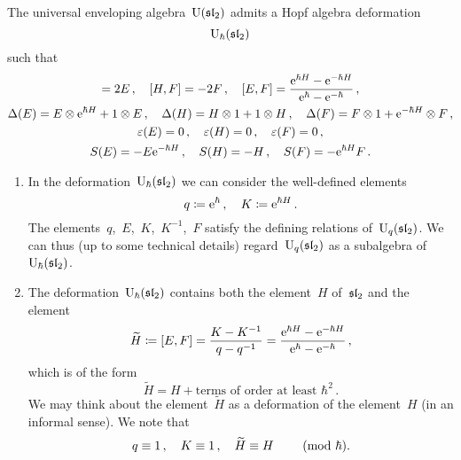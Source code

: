 \documentclass[a4paper, 11pt, oneside]{scrartcl}
\begin{document}
\begin{theorem}
  The universal enveloping algebra~$\operatorname{U}(\mathfrak{sl}_2)$ admits a Hopf algebra deformation
  \[
    \operatorname{U}_{\hbar}(\mathfrak{sl}_2)
  \]
  such that
  \begin{gather*}
    [H, E] = 2E \,,
    \quad
    [H, F] = -2F \,,
    \quad
    [E, F]
    =
    \frac{ \e^{\hbar H} - \e^{-\hbar H} }{ \e^{\hbar} - \e^{-\hbar} } \,,
    \\
    \Delta(E) = E \tensor \e^{\hbar H} + 1 \tensor E \,,
    \quad
    \Delta(H) = H \tensor 1 + 1 \tensor H \,,
    \quad
    \Delta(F) = F \tensor 1 + \e^{-\hbar H} \tensor F \,,
    \\
    \varepsilon(E) = 0 \,,
    \quad
    \varepsilon(H) = 0 \,,
    \quad
    \varepsilon(F) = 0 \,,
    \\
    S(E) = -E \e^{-\hbar H} \,,
    \quad
    S(H) = -H \,,
    \quad
    S(F) = - \e^{\hbar H} F \,.
  \end{gather*}
\end{theorem}

\begin{remark}
  \leavevmode
  \begin{enumerate}
    \item
      In the deformation~$\operatorname{U}_{\hbar}(\mathfrak{sl}_2)$ we can consider the well-defined elements
      \[
        q \coloneqq \mathrm{e}^{\hbar} \,,
        \quad
        K \coloneqq \mathrm{e}^{\hbar H} \,.
      \]
      The elements~$q$,~$E$,~$K$,~$K^{-1}$,~$F$ satisfy the defining relations of~$\operatorname{U}_q(\mathfrak{sl}_2)$.
      We can thus (up to some technical details) regard~$\operatorname{U}_q(\mathfrak{sl}_2)$ as a subalgebra of~$\operatorname{U}_{\hbar}(\mathfrak{sl}_2)$.
    \item
      The deformation~$\operatorname{U}_{\hbar}(\mathfrak{sl}_2)$ contains both the element~$H$ of~$\mathfrak{sl}_2$ and the element
      \[
        \widetilde{H}
        \coloneqq
        [E,F]
        =
        \frac{K - K^{-1}}{q - q^{-1}}
        =
        \frac{\mathrm{e}^{\hbar H} - \mathrm{e}^{-\hbar H}}{\mathrm{e}^{\hbar} - \mathrm{e}^{-\hbar}} \,,
      \]
      which is of the form
      \[
        \widetilde{H}
        =
        H + \text{terms of order at least~$\hbar^2$} \,.
      \]
      We may think about the element~$\widetilde{H}$ as a deformation of the element~$H$ (in an informal sense).
      We note that
      \[
        q \equiv 1 \,,
        \quad
        K \equiv 1 \,,
        \quad
        \widetilde{H} \equiv H
        \qquad
        \ (\mathrm{mod}\ \hbar).
      \]
  \end{enumerate}
\end{remark}
\end{document}
